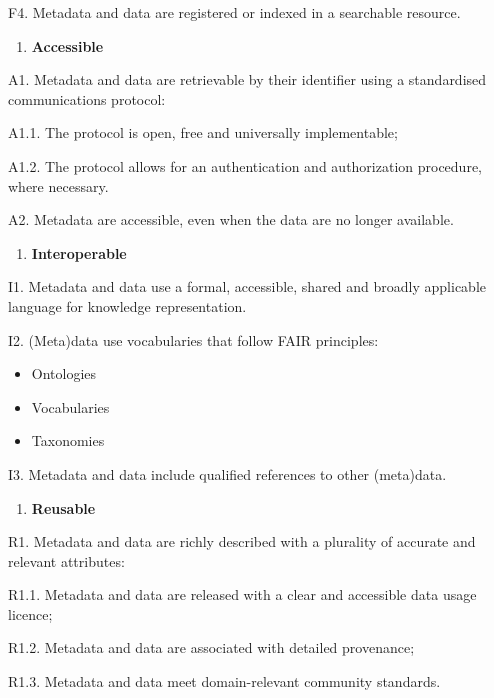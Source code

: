 \documentclass[
]{book}
\providecommand{\tightlist}{%
  \setlength{\itemsep}{0pt}\setlength{\parskip}{0pt}}
\begin{document}
F4. Metadata and data are registered or indexed in a searchable resource.

\begin{enumerate}
\def\labelenumi{\arabic{enumi}.}
\tightlist
\item
  \textbf{Accessible}
\end{enumerate}

A1. Metadata and data are retrievable by their identifier using a standardised communications protocol:

A1.1. The protocol is open, free and universally implementable;

A1.2. The protocol allows for an authentication and authorization procedure, where necessary.

A2. Metadata are accessible, even when the data are no longer available.

\begin{enumerate}
\def\labelenumi{\arabic{enumi}.}
\tightlist
\item
  \textbf{Interoperable}
\end{enumerate}

I1. Metadata and data use a formal, accessible, shared and broadly applicable language for knowledge representation.

I2. (Meta)data use vocabularies that follow FAIR principles:

\begin{itemize}
\tightlist
\item
  Ontologies
\item
  Vocabularies
\item
  Taxonomies
\end{itemize}

I3. Metadata and data include qualified references to other (meta)data.

\begin{enumerate}
\def\labelenumi{\arabic{enumi}.}
\tightlist
\item
  \textbf{Reusable}
\end{enumerate}

R1. Metadata and data are richly described with a plurality of accurate and relevant attributes:

R1.1. Metadata and data are released with a clear and accessible data usage licence;

R1.2. Metadata and data are associated with detailed provenance;

R1.3. Metadata and data meet domain-relevant community standards.
\end{document}
